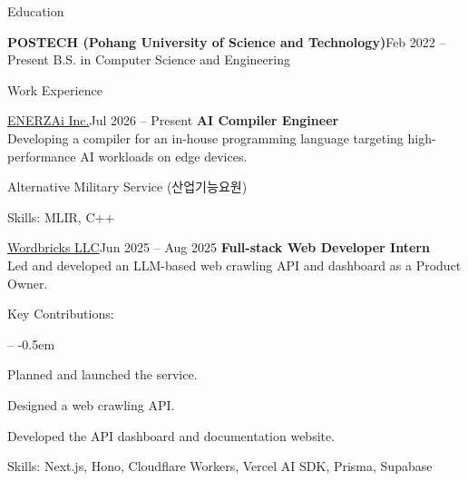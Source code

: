\documentclass{resume}
\begin{document}
\begin{rSection}{Education}
	\begin{rEducation}{\textbf{POSTECH (Pohang University of Science and Technology)}}{Feb 2022 -- Present}
		B.S. in Computer Science and Engineering
	\end{rEducation}

\end{rSection}

\begin{rSection}{Work Experience}
	\begin{rSubsection}{\href{https://enerzai.com}{ENERZAi Inc.}}{Jul 2026 -- Present}
		\textbf{AI Compiler Engineer}
		\\ [0.2em]
		Developing a compiler for an in-house programming language targeting high-performance AI workloads on edge devices.
		\item Alternative Military Service (산업기능요원)
		\item Skills: MLIR, C++
	\end{rSubsection}
	\begin{rSubsection}{\href{https://wordbricks.ai}{Wordbricks LLC}}{Jun 2025 -- Aug 2025}
		\textbf{Full-stack Web Developer Intern}
		\\ [0.2em]
		Led and developed an LLM-based web crawling API and dashboard as a Product Owner.

		\item Key Contributions:
		\vspace{-0.5em}
		\begin{list}{--}{}
			\itemsep -0.5em
			\item Planned and launched the service.
			\item Designed a web crawling API.
			\item Developed the API dashboard and documentation website.
		\end{list}
		\item Skills: Next.js, Hono, Cloudflare Workers, Vercel AI SDK, Prisma, Supabase
	\end{rSubsection}


\end{rSection}
\end{document}
